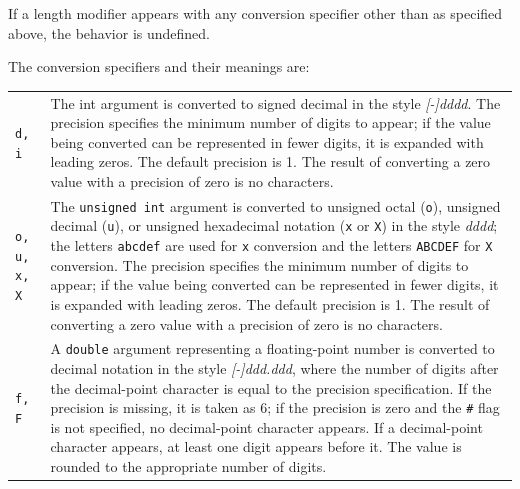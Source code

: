 If a length modifier appears with any conversion specifier other than as
specified above, the behavior is undefined.

The conversion specifiers and their meanings are:

\begin{longtable}{p{}p{}}
\texttt{d, i}&The int argument is converted to signed decimal in the style
\textit{[-]dddd}. The precision specifies the minimum number of digits to
appear; if the value being converted can be represented in fewer digits, it is
expanded with leading zeros. The default precision is 1. The result of
converting a zero value with a precision of zero is no characters.\\
\texttt{o, u, x, X}&The \texttt{unsigned int} argument is converted to unsigned
octal (\texttt{o}), unsigned decimal (\texttt{u}), or unsigned hexadecimal
notation (\texttt{x} or \texttt{X}) in the style \textit{dddd}; the 
letters \texttt{abcdef} are used for \texttt{x} conversion and the letters
\texttt{ABCDEF} for \texttt{X} conversion. The precision specifies the minimum
number of digits to appear; if the value being converted can be represented in
fewer digits, it is expanded with leading zeros. The default precision is
1. The result of converting a zero value with a precision of zero is no
characters.\\
\texttt{f, F}&A \texttt{double} argument representing a floating-point number
is converted to decimal notation in the style \textit{[-]ddd.ddd}, where the
number of digits after the decimal-point character is equal to the precision
specification. If the precision is missing, it is taken as 6; if the precision
is zero and the \texttt{\#} flag is not specified, no decimal-point character
appears. If a decimal-point character appears, at least one digit appears
before it. The value is rounded to the appropriate number of digits.


\end{longtable}
